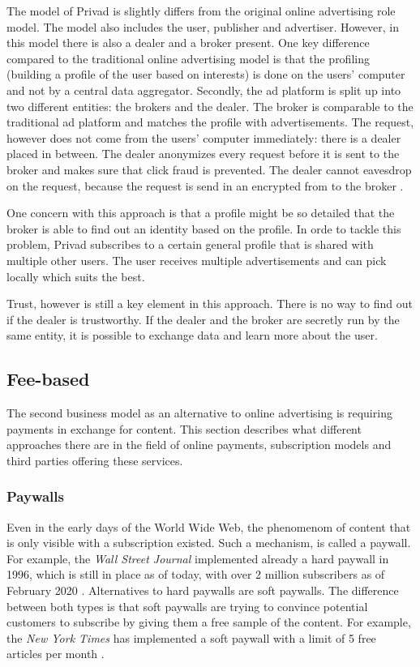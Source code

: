 The model of Privad is slightly differs from the original online advertising role model. The model also includes the user, publisher and advertiser. However, in this model there is also a dealer and a broker present. One key difference compared to the traditional online advertising model is that the profiling (building a profile of the user based on interests) is done on the users' computer and not by a central data aggregator. Secondly, the ad platform is split up into two different entities: the brokers and the dealer. The broker is comparable to the traditional ad platform and matches the profile with advertisements. The request, however does not come from the users' computer immediately: there is a dealer placed in between. The dealer anonymizes every request before it is sent to the broker and makes sure that click fraud is prevented. The dealer cannot eavesdrop on the request, because the request is send in an encrypted from to the broker \cite{guha2011privad}. 

One concern with this approach is that a profile might be so detailed that the broker is able to find out an identity based on the profile. In orde to tackle this problem, Privad subscribes to a certain general profile that is shared with multiple other users. The user receives multiple advertisements and can pick locally which suits the best.

Trust, however is still a key element in this approach. There is no way to find out if the dealer is trustworthy. If the dealer and the broker are secretly run by the same entity, it is possible to exchange data and learn more about the user. 

\subsection{Fee-based}

The second business model as an alternative to online advertising is requiring payments in exchange for content. This section describes what different approaches there are in the field of online payments, subscription models and third parties offering these services.

\subsubsection{Paywalls}

Even in the early days of the World Wide Web, the phenomenom of content that is only visible with a subscription existed. Such a mechanism, is called a paywall. For example, the \textit{Wall Street Journal} implemented already a hard paywall in 1996, which is still in place as of today, with over 2 million subscribers as of February 2020 \cite{firstpaywall}. 
Alternatives to hard paywalls are soft paywalls. The difference between both types is that soft paywalls are trying to convince potential customers to subscribe by giving them a free sample of the content. For example, the \textit{New York Times} has implemented a soft paywall with a limit of 5 free articles per month \cite{cook2012paying}.

